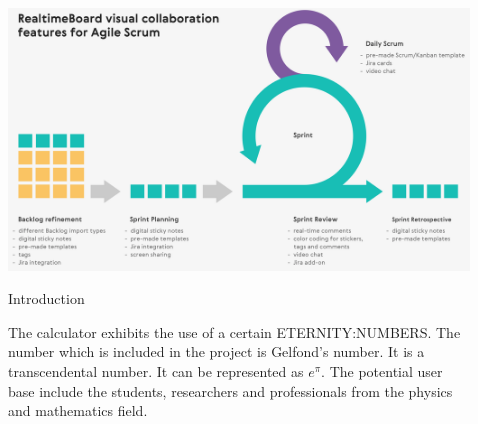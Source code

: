 \documentclass[final]{beamer}
\newlength{\sepwid}
\newlength{\onecolwid}
\newlength{\twocolwid}
\begin{document}
\begin{frame}
\begin{columns}[t]
\begin{column}{\onecolwid}
\end{column} %

\begin{column}{\sepwid}\end{column} %

\begin{column}{\twocolwid} %




\vspace{1em}
\includegraphics[scale=0.56]{img/rtb_scrum_agile_slide_2.png}
\newline
\begin{exampleblock}{Introduction}

The calculator exhibits the use of a certain ETERNITY:NUMBERS. The number which is included in the project is Gelfond's number. It is a transcendental number. It can be represented as $e^{\pi}$. The potential user base include the students, researchers and professionals from the physics and mathematics field. 

\end{exampleblock} 


\begin{columns}[t,totalwidth=\twocolwid] %

\begin{column}{\onecolwid} %


\end{column}
\end{columns}
\end{column}
\end{columns}
\end{frame}
\end{document}
